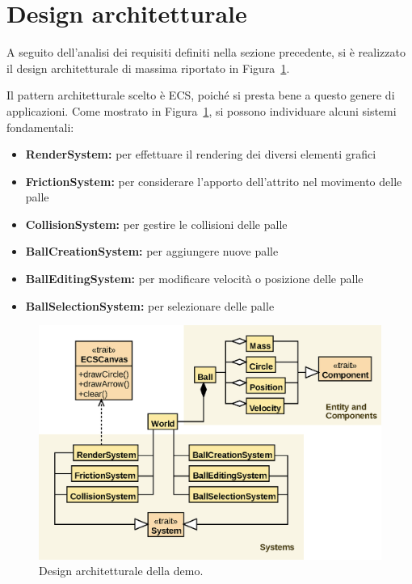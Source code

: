 \section{Design architetturale}\label{sec:demo-design-architetturale}
A seguito dell'analisi dei requisiti definiti nella sezione precedente, si è realizzato il design architetturale di
massima riportato in Figura~\ref{fig:demo-architechture}.

Il pattern architetturale scelto è ECS, poiché si presta bene a questo genere di applicazioni.
Come mostrato in Figura~\ref{fig:demo-architechture}, si possono individuare alcuni sistemi fondamentali:
\begin{itemize}
    \item \textbf{RenderSystem:} per effettuare il rendering dei diversi elementi grafici
    \item \textbf{FrictionSystem:} per considerare l'apporto dell'attrito nel movimento delle palle
    \item \textbf{CollisionSystem:} per gestire le collisioni delle palle
    \item \textbf{BallCreationSystem:} per aggiungere nuove palle
    \item \textbf{BallEditingSystem:} per modificare velocità o posizione delle palle
    \item \textbf{BallSelectionSystem:} per selezionare delle palle
\end{itemize}

\begin{figure}[H]
    \centering
    \includegraphics[width=\textwidth]{./img/DemoArchitecture}
    \caption{Design architetturale della demo.}
    \label{fig:demo-architechture}
\end{figure}

